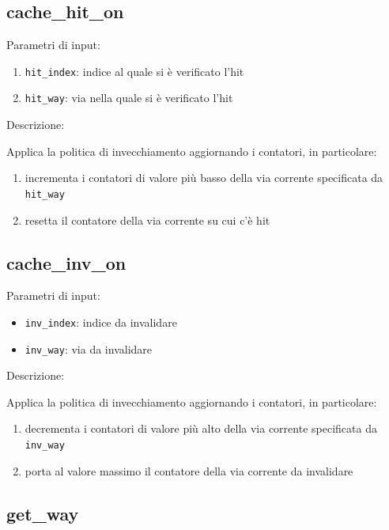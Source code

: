\subsection{cache\_hit\_on} %

Parametri di input:
\begin{enumerate}
  \item \texttt{hit\_index}: indice al quale si \`e verificato l'hit
  \item \texttt{hit\_way}: via nella quale si \`e verificato l'hit
\end{enumerate}

Descrizione:

Applica la politica di invecchiamento aggiornando i contatori, in particolare:
\begin{enumerate}
  \item incrementa i contatori di valore pi\`u basso della via corrente specificata da \texttt{hit\_way}
  \item resetta il contatore della via corrente su cui c'\`e hit
\end{enumerate}	

\subsection{cache\_inv\_on} %

Parametri di input:
\begin{itemize}
  \item \texttt{inv\_index}: indice da invalidare
  \item \texttt{inv\_way}: via da invalidare
\end{itemize}

Descrizione:

Applica la politica di invecchiamento aggiornando i contatori, in particolare:
\begin{enumerate}
  \item decrementa i contatori di valore pi\`u alto della via corrente specificata da \texttt{inv\_way}
  \item porta al valore massimo il contatore della via corrente da invalidare
\end{enumerate}	
	

\subsection{get\_way} %

